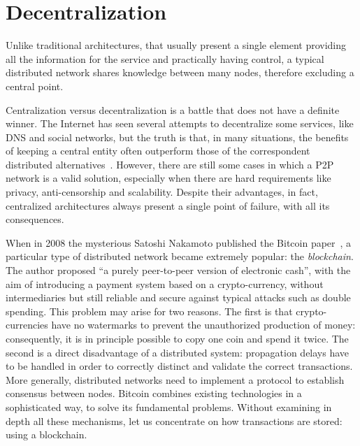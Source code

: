 \section{Decentralization}
\label{sec:decentralization}

Unlike traditional architectures, that usually present a single element providing all the information for the service and practically having control, a typical distributed network shares knowledge between many nodes, therefore excluding a central point.

Centralization versus decentralization is a battle that does not have a definite winner. The Internet has seen several attempts to decentralize some services, like DNS and social networks, but the truth is that, in many situations, the benefits of keeping a central entity often outperform those of the correspondent distributed alternatives~\cite{Montresor_Permissionless}. However, there are still some cases in which a P2P network is a valid solution, especially when there are hard requirements like privacy, anti-censorship and scalability. Despite their advantages, in fact, centralized architectures always present a single point of failure, with all its consequences.

When in 2008 the mysterious Satoshi Nakamoto published the Bitcoin paper~\cite{bitcoin}, a particular type of distributed network became extremely popular: the \emph{blockchain}. The author proposed ``a purely peer-to-peer version of electronic cash'', with the aim of introducing a payment system based on a crypto-currency, without intermediaries but still reliable and secure against typical attacks such as double spending. This problem may arise for two reasons. The first is that crypto-currencies have no watermarks to prevent the unauthorized production of money: consequently, it is in principle possible to copy one coin and spend it twice. The second is a direct disadvantage of a distributed system: propagation delays have to be handled in order to correctly distinct and validate the correct transactions. More generally, distributed networks need to implement a protocol to establish consensus between nodes.
Bitcoin combines existing technologies in a sophisticated way, to solve its fundamental problems. Without examining in depth all these mechanisms, let us concentrate on how transactions are stored: using a blockchain.

